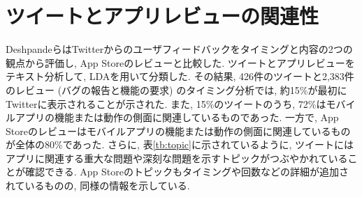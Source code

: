 


\section{ツイートとアプリレビューの関連性}
Deshpandeら\cite{tweetapp}はTwitterからのユーザフィードバックをタイミングと内容の2つの観点から評価し, App Storeのレビューと比較した. 
ツイートとアプリレビューをテキスト分析して, LDA\cite{lda}を用いて分類した. その結果, 426件のツイートと2,383件のレビュー (バグの報告と機能の要求)  のタイミング分析では, 約15\%が最初にTwitterに表示されることが示された. 
また, 15\%のツイートのうち, 72\%はモバイルアプリの機能または動作の側面に関連しているものであった. 一方で, App Storeのレビューはモバイルアプリの機能または動作の側面に関連しているものが全体の80\%であった. 
さらに, 表\ref{tb:topic}に示されているように, ツイートにはアプリに関連する重大な問題や深刻な問題を示すトピックがつぶやかれていることが確認できる. App Storeのトピックもタイミングや回数などの詳細が追加されているものの, 同様の情報を示している. 

